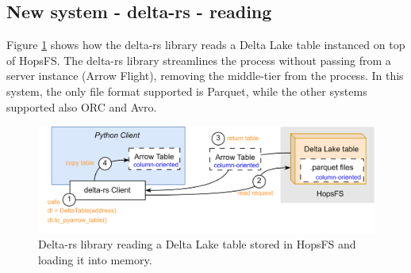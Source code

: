 \subsection{New system - delta-rs - reading}
\label{subsec:back_sys_delta_read}

Figure \ref{fig:delta_read} shows how the delta-rs library reads a Delta Lake table instanced on top of \gls{HopsFS}. The delta-rs library streamlines the process without passing from a server instance (Arrow Flight), removing the middle-tier from the process. In this system, the only file format supported is Parquet, while the other systems supported also ORC and Avro.

\begin{figure}
    \begin{center}
      \includegraphics[width=\textwidth]{figures/2-background_and_related_work/delta_read.png}
    \end{center}
    \caption[New system - delta-rs - read process]{Delta-rs library reading a Delta Lake table stored in \gls{HopsFS} and loading it into memory.}
    \label{fig:delta_read}
\end{figure}